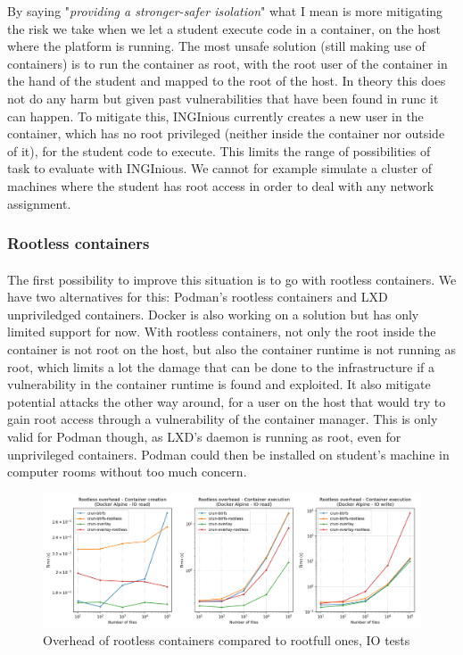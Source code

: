 By saying "\textit{providing a stronger-safer isolation}" what I mean is more mitigating the risk we take when we let a student execute code in a container, on the host where the platform is running.  The most unsafe solution (still making use of containers) is to run the container as root, with the root user of the container in the hand of the student and mapped to the root of the host.  In theory this does not do any harm but given past vulnerabilities that have been found in runc it can happen.  To mitigate this, INGInious currently creates a new user in the container, which has no root privileged (neither inside the container nor outside of it), for the student code to execute.  This limits the range of possibilities of task to evaluate with INGInious.  We cannot for example simulate a cluster of machines where the student has root access in order to deal with any network assignment.

\subsubsection{Rootless containers}
\paragraph{}The first possibility to improve this situation is to go with rootless containers.  We have two alternatives for this: Podman's rootless containers and LXD unpriviledged containers.  Docker is also working on a solution but has only limited support for now.  With rootless containers, not only the root inside the container is not root on the host, but also the container runtime is not running as root, which limits a lot the damage that can be done to the infrastructure if a vulnerability in the container runtime is found and exploited.  It also mitigate potential attacks the other way around, for a user on the host that would try to gain root access through a vulnerability of the container manager.  This is only valid for Podman though, as LXD's daemon is running as root, even for unprivileged containers.  Podman could then be installed on student's machine in computer rooms without too much concern.

\begin{figure}[h!]
  \begin{center}
    \includegraphics[width=\linewidth]{images/question-3-rootless-io.png}
    \caption{Overhead of rootless containers compared to rootfull ones, IO tests}
    \label{fig:q3:rootless:io}
  \end{center}
\end{figure}

